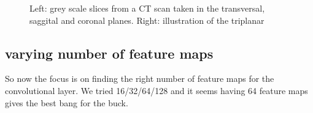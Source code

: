\begin{figure}
\centering
\begin{minipage}{0.45\textwidth}
\centering
{}
\end{minipage}\hfill
\hspace{-1cm}
\begin{minipage}{0.45\textwidth}
\centering
{}
\end{minipage}
\caption{Left: grey scale slices from a CT scan taken in the transversal, saggital and coronal planes. Right: illustration of the triplanar}
\end{figure}

\subsection{varying number of feature maps}

So now the focus is on finding the right number of feature maps for the convolutional layer. We tried 16/32/64/128 and it seems having 64 feature maps gives the best bang for the buck.

